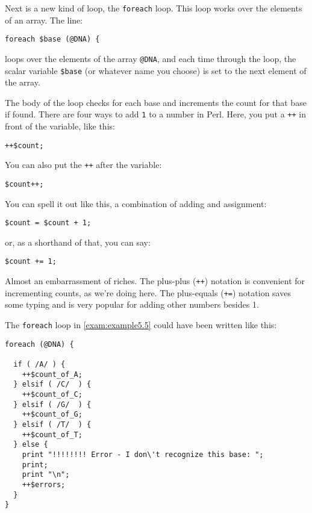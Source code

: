 Next is a new kind of loop, the \verb|foreach| loop. This loop works over the elements of an array. The line: 

\begin{lstlisting}
foreach $base (@DNA) {
\end{lstlisting}

loops over the elements of the array \verb|@DNA|, and each time through the loop, the scalar variable \verb|$base| (or whatever name you choose) is set to the next element of the array.

The body of the loop checks for each base and increments the count for
that base if found. There are four ways to add \verb|1| to a number in Perl.
Here, you put a \verb|++| in front of the variable, like this:

\begin{lstlisting}
++$count; 
\end{lstlisting}

You can also put the \verb|++| after the variable:

\begin{lstlisting}
$count++;
\end{lstlisting}

You can spell it out like this, a combination of adding and assignment:

\begin{lstlisting}
$count = $count + 1;
\end{lstlisting}

or, as a shorthand of that, you can say:

\begin{lstlisting}
$count += 1;
\end{lstlisting}

Almost an embarrassment of riches. The plus-plus (\verb|++|) notation is convenient for incrementing counts, as we're doing here. The plus-equals (\verb|+=|) notation saves some typing and is very popular for adding other numbers besides 1.

The \verb|foreach| loop in \autoref{exam:example5.5} could have been written like this:

\begin{lstlisting}
foreach (@DNA) {
  
  if ( /A/ ) {
    ++$count_of_A;
  } elsif ( /C/  ) {
    ++$count_of_C;
  } elsif ( /G/  ) {
    ++$count_of_G;
  } elsif ( /T/  ) {
    ++$count_of_T;
  } else {
    print "!!!!!!!! Error - I don\'t recognize this base: ";
    print;
    print "\n";
    ++$errors;
  }
}
\end{lstlisting}

